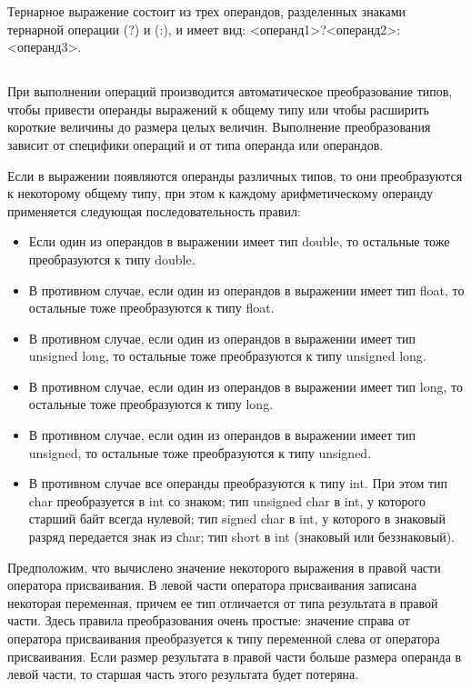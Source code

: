 Тернарное выражение состоит из трех операндов, разделенных знаками тернарной операции (?) и (:), и имеет вид: <операнд1>?<операнд2>:<операнд3>.

\subsection{}

При выполнении операций производится автоматическое преобразование типов, чтобы привести операнды выражений к общему типу или чтобы расширить короткие величины до размера целых величин. Выполнение преобразования зависит от специфики операций и от типа операнда или операндов. 

Если в выражении появляются операнды различных типов, то они преобразуются к некоторому общему типу, при этом к каждому арифметическому операнду применяется следующая последовательность правил:
\begin{itemize}
\item Если один из операндов в выражении имеет тип double, то остальные тоже преобразуются к типу double.
\item В противном случае, если один из операндов в выражении имеет тип float, то остальные тоже преобразуются к типу float.
\item В противном случае, если один из операндов в выражении имеет тип unsigned long, то остальные тоже преобразуются к типу unsigned long.
\item В противном случае, если один из операндов в выражении имеет тип long, то остальные тоже преобразуются к типу long.
\item В противном случае, если один из операндов в выражении имеет тип unsigned, то остальные тоже преобразуются к типу unsigned.
\item В противном случае все операнды преобразуются к типу int. При этом тип char преобразуется в int со знаком; тип unsigned char в int, у которого старший байт всегда нулевой; тип signed char в int, у которого в знаковый разряд передается знак из сhar; тип short в int (знаковый или беззнаковый). \BL
\end{itemize}

Предположим, что вычислено значение некоторого выражения в правой части оператора присваивания. В левой части оператора присваивания записана некоторая переменная, причем ее тип отличается от типа результата в правой части. Здесь правила преобразования очень простые: значение справа от оператора присваивания преобразуется к типу переменной слева от оператора присваивания. Если размер результата в правой части больше размера операнда в левой части, то старшая часть этого результата будет потеряна. \killoverfullbefore

